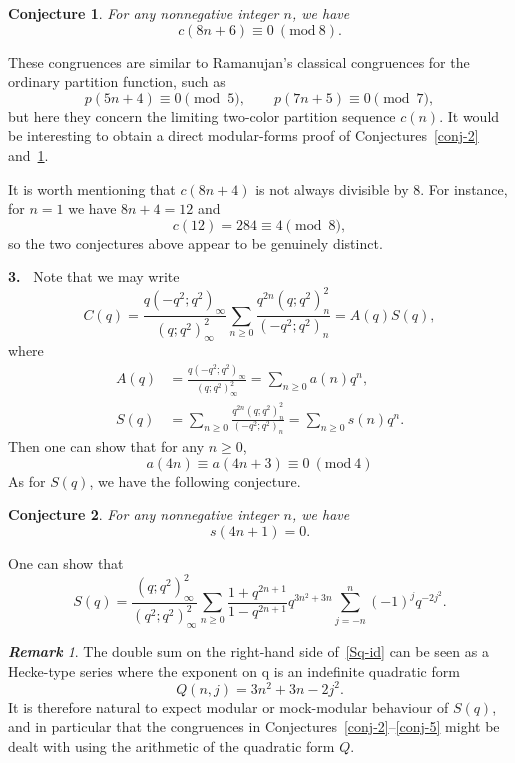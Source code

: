 \documentclass[reqno]{amsart}
\theoremstyle{definition}
\theoremstyle{plain}
\newtheorem{conjecture} {Conjecture}
\theoremstyle{remark}
\newtheorem{remark}{{\bf Remark}}
\numberwithin{equation}{section}
\newcommand{\Mod}[1]{\ (\mathrm{mod}\ #1)}
\newcommand{\fr}{\frac}
\begin{document}
\begin{conjecture}\label{conj-3}
For any nonnegative integer $n$, we have
\[
c(8n+6) \equiv 0 \Mod{8}.
\]
\end{conjecture}
%
These congruences are similar to Ramanujan's classical congruences for the ordinary partition function, such as
\[
p(5n+4)\equiv 0 \pmod{5},\qquad p(7n+5)\equiv 0 \pmod{7},
\]
but here they concern the limiting two-color partition sequence  $c(n)$. It would be interesting to obtain a direct modular-forms proof of Conjectures~\ref{conj-2} and~\ref{conj-3}.
\medskip

It is worth mentioning that $c(8n+4)$ is not always divisible by $8$. For instance, for $n=1$ we have $8n+4=12$ and
\[
c(12)=284\equiv 4 \pmod{8},
\]
so the two conjectures above appear to be genuinely distinct.

{\bf 3.\ } Note that we may write
\[
C(q) = \fr{q(-q^2;q^2)_\infty}{(q;q^2)_\infty^2} \sum_{n\geq 0} \fr{q^{2n}(q;q^2)_n^2}{(-q^2;q^2)_n} = A(q) S(q),
\]
where
\begin{align*}
A(q)&= \fr{q(-q^2;q^2)_\infty}{(q;q^2)_\infty^2} = \sum_{n\geq 0} a(n) q^n, \\
S(q) &= \sum_{n\geq 0}\fr{q^{2n}(q;q^2)_n^2}{(-q^2;q^2)_n} = \sum_{n\geq 0} s(n) q^n.
\end{align*}
Then one can show that for any $n\geq 0$,
\[
a(4n) \equiv a(4n+3) \equiv 0\Mod{4}
\]
As for $S(q)$, we have the following conjecture.
\begin{conjecture}\label{conj-4}
For any nonnegative integer $n$, we have
\[
s(4n+1) =0.
\]
\end{conjecture}
One can show that
\begin{equation}\label{Sq-id}
S(q)= \fr{(q;q^2)_\infty^2}{(q^2;q^2)_\infty^2}\sum_{n\geq 0}\fr{1+q^{2n+1}}{1-q^{2n+1}} q^{3n^2+3n}\sum_{j=-n}^n (-1)^j q^{-2j^2}.
\end{equation}
%
\begin{remark}
The double sum on the right-hand side of~\eqref{Sq-id} can be seen as a Hecke-type series where the exponent
on q is an indefinite quadratic form
\[
Q(n,j)=3n^2+3n-2j^2.
\]
It is therefore natural to expect modular or mock-modular behaviour of $S(q)$, and in particular that the congruences in Conjectures~\ref{conj-2}--\ref{conj-5} might be dealt with using the arithmetic of the quadratic form $Q$.
\end{remark}
\end{document}
